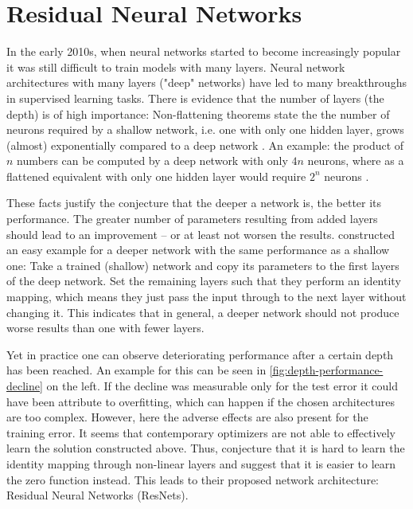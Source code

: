 \section{Residual Neural Networks}
\label{sec:neural-networks}

In the early 2010s, when neural networks started to become increasingly popular it was still difficult to train models with many layers.
Neural network architectures with many layers ("deep" networks) have led to many breakthroughs in supervised learning tasks.
There is evidence that the number of layers (the depth) is of high importance:
Non-flattening theorems state the the number of neurons required by a shallow network, i.e. one with only one hidden layer, grows (almost) exponentially compared to a deep network \cite{lin17,delalleau11}.
An example: the product of $n$ numbers can be computed by a deep network with only $4n$ neurons, where as a flattened equivalent with only one hidden layer would require $2^n$ neurons \cite{lin17}.

These facts justify the conjecture that the deeper a network is, the better its performance.
The greater number of parameters resulting from added layers should lead to an improvement --  or at least not worsen the results.
\citet{he16} constructed an easy example for a deeper network with the same performance as a shallow one:
Take a trained (shallow) network and copy its parameters to the first layers of the deep network.
Set the remaining layers such that they perform an identity mapping, which means they just pass the input through to the next layer without changing it.
This indicates that in general, a deeper network should not produce worse results than one with fewer layers.



Yet in practice one can observe deteriorating performance after a certain depth has been reached.
An example for this can be seen in \cref{fig:depth-performance-decline} on the left.
If the decline was measurable only for the test error it could have been attribute to overfitting, which can happen if the chosen architectures are too complex.
However, here the adverse effects are also present for the training error.
It seems that contemporary optimizers are not able to effectively learn the solution constructed above.
Thus, \citet{he16} conjecture that it is hard to learn the identity mapping through non-linear layers and suggest that it is easier to learn the zero function instead.
This leads to their proposed network architecture: Residual Neural Networks (ResNets).

